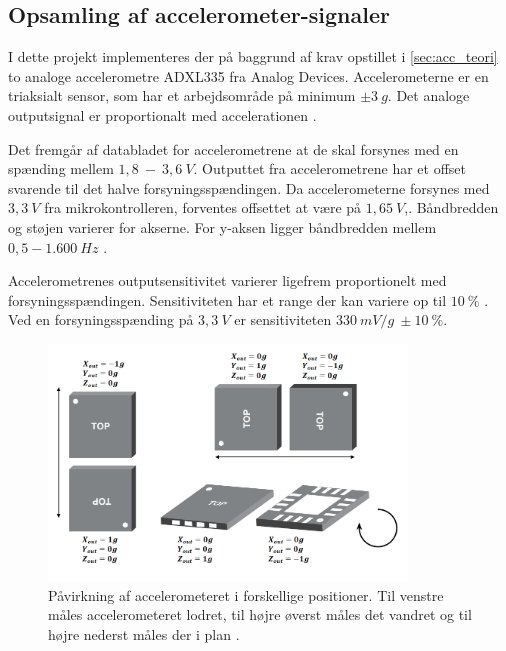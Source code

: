 \subsection{Opsamling af accelerometer-signaler}\label{sec:acc_imp}

I dette projekt implementeres der på baggrund af krav opstillet i \autoref{sec:acc_teori} to analoge accelerometre ADXL335 fra Analog Devices. Accelerometerne er en triaksialt sensor, som har et arbejdsområde på minimum $\pm3~g$. Det analoge outputsignal er proportionalt med accelerationen \citep{analogdevices2009}. 

Det fremgår af databladet for accelerometrene at de skal forsynes med en spænding mellem $1,8~-~3,6~V$. Outputtet fra accelerometrene har et offset svarende til det halve forsyningsspændingen. Da accelerometerne forsynes med $3,3~V$ fra mikrokontrolleren, forventes offsettet at være på $1,65~V$,. Båndbredden og støjen varierer for akserne. For y-aksen ligger båndbredden mellem $0,5 - 1.600~Hz$  \citep{analogdevices2010}.

Accelerometrenes outputsensitivitet varierer ligefrem proportionelt med forsyningsspændingen. Sensitiviteten har et range der kan variere op til $10~\%$ \citep{analogdevices2010}. Ved en forsyningsspænding på $3,3~V$ er sensitiviteten $330~mV/g~\pm 10~\%$. 

\begin{figure}[H]
\centering
\includegraphics[width=0.85\textwidth]{figures/acc_paavirkning}
\caption{Påvirkning af accelerometeret i forskellige positioner. Til venstre måles accelerometeret lodret, til højre øverst måles det vandret og til højre nederst måles der i plan \citep{analogdevices2010}.}
\label{fig:acc}
\end{figure}

